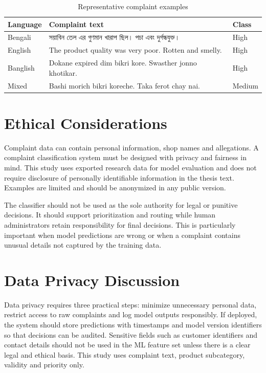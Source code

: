 \documentclass[12pt,a4paper,openany]{book}
\newcommand{\bn}[1]{{\banglafont #1}}
\newcommand{\bn}[1]{#1}
\begin{document}
\begin{table}[H]
\centering
\caption{Representative complaint examples}
\label{tab:complaint_examples}
\small
\begin{tabular}{p{}p{}p{}}
\toprule
\textbf{Language} & \textbf{Complaint text} & \textbf{Class}\\
\midrule
Bengali & \bn{সয়াবিন তেল এর গুণমান খারাপ ছিল। পচা এবং দুর্গন্ধযুক্ত।} & High\\
English & The product quality was very poor. Rotten and smelly. & High\\
Banglish & Dokane expired dim bikri kore. Swasther jonno khotikar. & High\\
Mixed & Bashi morich bikri koreche. Taka ferot chay nai. & Medium\\
\bottomrule
\end{tabular}
\end{table}

\section{Ethical Considerations}
Complaint data can contain personal information, shop names and allegations. A complaint classification system must be designed with privacy and fairness in mind. This study uses exported research data for model evaluation and does not require disclosure of personally identifiable information in the thesis text. Examples are limited and should be anonymized in any public version.

The classifier should not be used as the sole authority for legal or punitive decisions. It should support prioritization and routing while human administrators retain responsibility for final decisions. This is particularly important when model predictions are wrong or when a complaint contains unusual details not captured by the training data.

\section{Data Privacy Discussion}
Data privacy requires three practical steps: minimize unnecessary personal data, restrict access to raw complaints and log model outputs responsibly. If deployed, the system should store predictions with timestamps and model version identifiers so that decisions can be audited. Sensitive fields such as customer identifiers and contact details should not be used in the ML feature set unless there is a clear legal and ethical basis. This study uses complaint text, product subcategory, validity and priority only.
\end{document}
